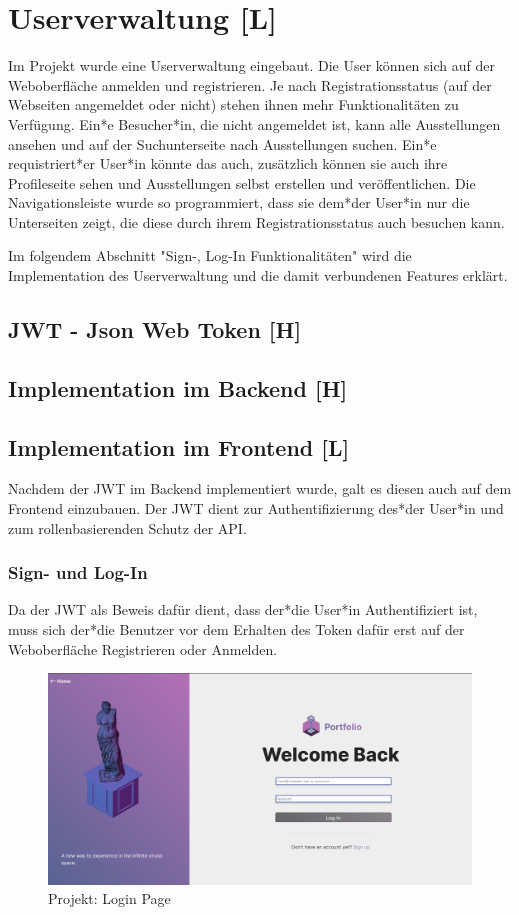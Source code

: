 \section{Userverwaltung [L]}
Im Projekt wurde eine Userverwaltung eingebaut. Die User können sich auf der Weboberfläche anmelden und registrieren. Je nach Registrationsstatus (auf der Webseiten angemeldet oder nicht) stehen ihnen mehr Funktionalitäten zu Verfügung. Ein*e Besucher*in, die nicht angemeldet ist, kann alle Ausstellungen ansehen und auf der Suchunterseite nach Ausstellungen suchen. Ein*e requistriert*er User*in könnte das auch, zusätzlich können sie auch ihre Profileseite sehen und Ausstellungen selbst erstellen und veröffentlichen. Die Navigationsleiste wurde so programmiert, dass sie dem*der User*in nur die Unterseiten zeigt, die diese durch ihrem Registrationsstatus auch besuchen kann. 

Im folgendem Abschnitt "Sign-, Log-In Funktionalitäten" wird die Implementation des Userverwaltung und die damit verbundenen Features erklärt. 

\subsection{JWT - Json Web Token [H]}
\subsection{Implementation im Backend [H]}
\subsection{Implementation im Frontend [L]}
Nachdem der JWT im Backend implementiert wurde, galt es diesen auch auf dem Frontend einzubauen. Der JWT dient zur Authentifizierung des*der User*in und zum rollenbasierenden Schutz der API. 

\subsubsection{Sign- und Log-In}
Da der JWT als Beweis dafür dient, dass der*die User*in Authentifiziert ist, muss sich der*die Benutzer vor dem Erhalten des Token dafür erst auf der Weboberfläche Registrieren oder Anmelden. 

\begin{figure}[h t]
    \centering
    \includegraphics[scale=0.25]{pics/GalleryLogIn.png}
    \caption{Projekt: Login Page}
    \label{fig:impl:login}
\end{figure}


